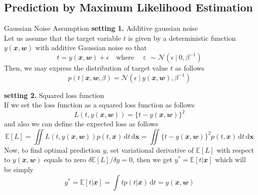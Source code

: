 \documentclass{bredelebeamer}
\begin{document}
\subsection{Prediction by Maximum Likelihood Estimation}
\begin{frame}{Gaussian Noise Assumption}
  \textbf{setting 1.} Additive gaussian noise \\
  Let us assume that the target variable $t$ is given by a deterministic function
  $y(\mathbfit{x}, \mathbfit{w})$ with additive Gaussian noise so that
  \begin{equation}
    t = y(\mathbfit{x}, \mathbfit{w}) + \epsilon
    \quad \textrm{where} \quad \upepsilon \sim \mathcal{N}(\epsilon \:|\: 0, \beta^{-1})
  \end{equation}
  Then, we may express the distribution of target value $t$ as follows
  \begin{equation}
    p(t \:|\: \mathbfit{x},\mathbfit{w},\beta) = \mathcal{N}(\epsilon \:|\: y(\mathbfit{x}, \mathbfit{w}), \beta^{-1})
  \end{equation}

  \vspace{1.0\baselineskip}
  \textbf{setting 2.} Squared loss function \\
  If we set the loss function as a squared loss function as follows
  \begin{equation}
    L(t, y(\mathbfit{x}, \mathbfit{w})) = {\{ t - y(\mathbfit{x}, \mathbfit{w}) \}}^2
  \end{equation}
  and also we can define the expected loss as follows
  \begin{equation}
    \mathbb{E}[L]
    = \iint L(t, y(\mathbfit{x}, \mathbfit{w})) p(t, \mathbfit{x})\, \mathrm{d}t\, \mathrm{d}\mathbf{x}
    = \iint {\{ t - y(\mathbfit{x}, \mathbfit{w}) \}}^2 p(t, \mathbfit{x})\, \mathrm{d}t\, \mathrm{d}\mathbf{x}
  \end{equation}
  Now, to find optimal prediction $y$, set variational derivative of $\mathbb{E}[L]$
  with respect to $y(\mathbfit{x}, \mathbfit{w})$ equals to zero $\delta\mathbb{E}[L] / \delta y = 0$,
  then we get $y^* = \mathbb{E}[t|\mathbfit{x}]$ which will be simply
  \begin{equation}
    y^* = \mathbb{E}[t|\mathbfit{x}]
    = \int tp(t|\mathbfit{x})\, \mathrm{d}t
    = y(\mathbfit{x}, \mathbfit{w})
  \end{equation}
\end{frame}
\end{document}
